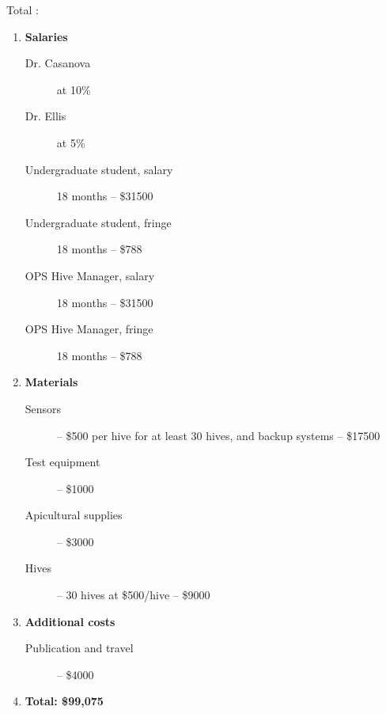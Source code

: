 Total :
\begin{enumerate}
\item \textbf{Salaries}
\begin{description}
\item[Dr. Casanova] at 10\%
\item[Dr. Ellis] at 5\%
\item[Undergraduate student, salary] 18 months -- \$31500
\item[Undergraduate student, fringe] 18 months -- \$788
\item[OPS Hive Manager, salary] 18 months -- \$31500
\item[OPS Hive Manager, fringe] 18 months -- \$788
\end{description}
\item \textbf{Materials}
\begin{description}
\item[Sensors] -- \$500 per hive for at least 30 hives, and backup systems -- \$17500 
\item[Test equipment] -- \$1000 
\item[Apicultural supplies] -- \$3000
\item[Hives] -- 30 hives at \$500/hive -- \$9000
\end{description}
\item \textbf{Additional costs}
\begin{description}
\item[Publication and travel] -- \$4000
\end{description}\item \textbf{Total: \$99,075
} 
\end{enumerate}
